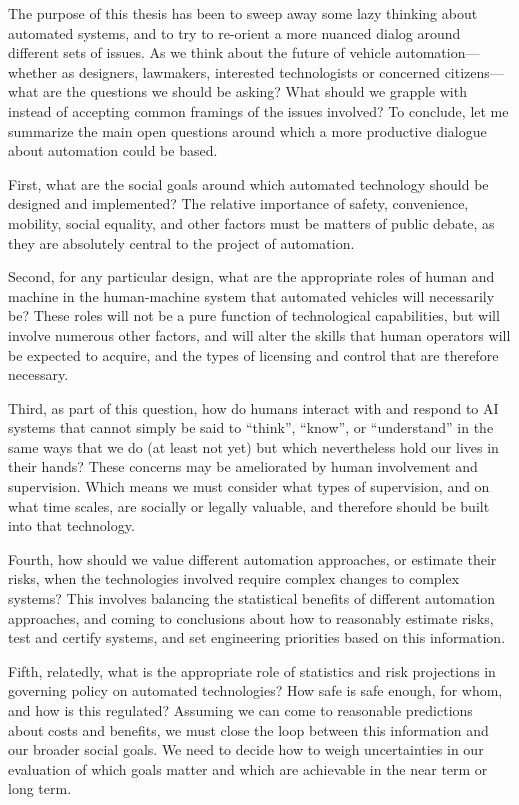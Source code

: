 The purpose of this thesis has been to sweep away some lazy thinking
about automated systems, and to try to re-orient a more nuanced dialog
around different sets of issues. As we think about the future of
vehicle automation---whether as
designers, lawmakers, interested technologists or concerned
citizens---what are the questions we should be asking? What should we
grapple with instead of accepting common framings of the issues
involved? To conclude, let me summarize the main open questions around
which a more productive dialogue about automation could be based.

First, what are the social goals around which automated technology
should be designed and implemented? The relative importance of safety,
convenience, mobility, social equality, and other factors must be
matters of public debate, as they are absolutely central to the
project of automation.

Second, for any particular design, what are the appropriate roles of
human and machine in the human-machine system that automated vehicles
will necessarily be? These roles will not be a pure function of
technological capabilities, but will involve numerous other factors,
and will alter the skills that human operators will be expected to
acquire, and the types of licensing and control that are therefore
necessary. 

Third, as part of this question, how do humans interact with and
respond to AI systems that cannot simply be said to
``think'', ``know'', or ``understand'' in the same ways that we do (at
least not yet) but which nevertheless hold our lives in their hands?
These concerns may be ameliorated by human involvement and
supervision. Which means we must consider what types of supervision,
and on what time scales, are socially or legally valuable, and
therefore should be built into that technology. 

Fourth, how should we value different automation approaches, or
estimate their risks, when the technologies involved require complex
changes to complex systems?  This
involves balancing the statistical benefits of different automation
approaches, and coming to conclusions about how to reasonably
estimate risks, test and certify systems, and set engineering
priorities based on this information.

Fifth, relatedly, what is the appropriate role of statistics and risk
projections in governing policy on automated technologies? How safe is
safe enough, for whom, and how is this
regulated? Assuming we can come to reasonable predictions about costs
and benefits, we must close the loop between this information and our
broader social goals. We need to decide how to weigh uncertainties in
our evaluation of which goals matter and which are achievable in the
near term or long term.

